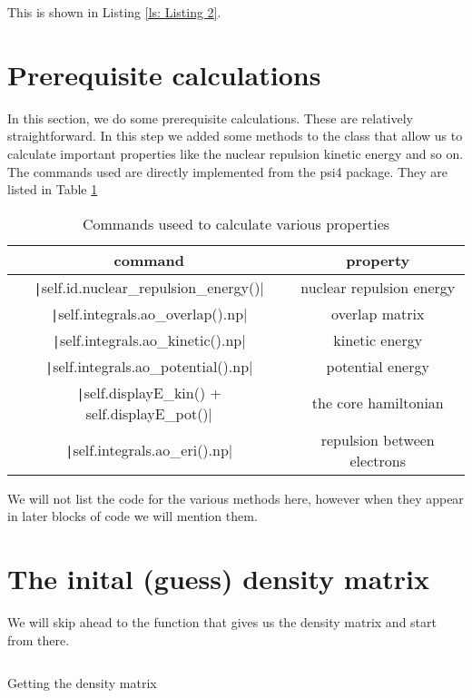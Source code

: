 \documentclass{article}
\begin{document}
This is shown in Listing \ref{ls: Listing 2}. 

\section{Prerequisite calculations}
\label{sec:step2}

In this section, we do some prerequisite calculations. These are relatively straightforward. In this step we added some methods to the class that allow us to calculate important properties like the nuclear repulsion kinetic energy and so on. The commands used are directly implemented from the psi4 package. They are listed in Table \ref{tab:my_label}

\begin{table}[hp]
    \centering
    \begin{tabular}{c|c}
        command & property \\
        \hline
        \texttt|self.id.nuclear_repulsion_energy()| & nuclear repulsion energy \\
        \texttt|self.integrals.ao_overlap().np| & overlap matrix \\
        \texttt|self.integrals.ao_kinetic().np| & kinetic energy \\
        \texttt|self.integrals.ao_potential().np| & potential energy \\
        \texttt|self.displayE_kin() + self.displayE_pot()| & the core hamiltonian \\
        \texttt|self.integrals.ao_eri().np| & repulsion between electrons \\
    \end{tabular}
    \caption{Commands useed to calculate various properties}
    \label{tab:my_label}
\end{table}
We will not list the code for the various methods here, however when they appear in later blocks of code we will mention them.

\section{The inital (guess) density matrix}
\label{sec:step3}
We will skip ahead to the function that gives us the density matrix and start from there.

\begin{listing}[ht]
    \centering
    \inputminted[firstline=110, lastline=116, autogobble]{python}{Hartree_FockL.py}
    \caption{Getting the density matrix}
    \label{ls: Listing 3}
\end{listing}
\end{document}
